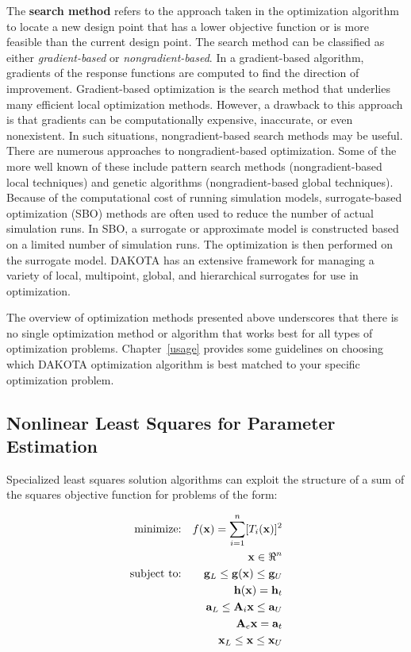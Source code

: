 The {\bf search method} refers to the approach taken in the
optimization algorithm to locate a new design point that has a lower
objective function or is more feasible than the current design point.
The search method can be classified as either \emph{gradient-based} or
\emph{nongradient-based}. In a gradient-based algorithm, gradients of
the response functions are computed to find the direction of
improvement.  Gradient-based optimization is the search method that
underlies many efficient local optimization methods. However, a
drawback to this approach is that gradients can be computationally
expensive, inaccurate, or even nonexistent. In such situations,
nongradient-based search methods may be useful. There are numerous
approaches to nongradient-based optimization. Some of the more well
known of these include pattern search methods (nongradient-based local
techniques) and genetic algorithms (nongradient-based global
techniques).  Because of the computational cost of running simulation
models, surrogate-based optimization (SBO) methods are often used to
reduce the number of actual simulation runs. In SBO, a surrogate or
approximate model is constructed based on a limited number of
simulation runs.  The optimization is then performed on the surrogate
model.  DAKOTA has an extensive framework for managing a variety of
local, multipoint, global, and hierarchical surrogates for use in
optimization.

The overview of optimization methods presented above underscores that
there is no single optimization method or algorithm that works best
for all types of optimization problems. Chapter~\ref{usage} provides
some guidelines on choosing which DAKOTA optimization algorithm is
best matched to your specific optimization problem.

\subsection{Nonlinear Least Squares for Parameter Estimation}\label{introduction:background:nonlinear}

Specialized least squares solution algorithms can exploit the
structure of a sum of the squares objective function for problems of
the form:

\begin{eqnarray}
  \hbox{minimize:} & & f(\mathbf{x}) =
  \sum_{i=1}^{n}[T_i(\mathbf{x})]^2\nonumber\\
  & & \mathbf{x} \in \Re^{n}\nonumber\\
  \hbox{subject to:} & &
  \mathbf{g}_L \leq \mathbf{g(x)} \leq \mathbf{g}_U\nonumber\\
  & & \mathbf{h(x)}=\mathbf{h}_{t}\label{introduction:equation02}\\
  & & \mathbf{a}_L \leq \mathbf{A}_i\mathbf{x} \leq
  \mathbf{a}_U\nonumber\\
  & & \mathbf{A}_e\mathbf{x}=\mathbf{a}_{t}\nonumber\\
  & & \mathbf{x}_L \leq \mathbf{x} \leq \mathbf{x}_U\nonumber
\end{eqnarray}

